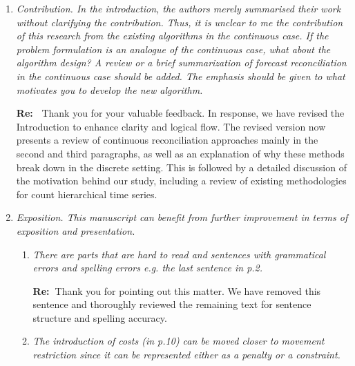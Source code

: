 \documentclass[11pt,a4paper]{article}
\newcommand{\RE}[2][Re:~]{{\color{blue}\textbf{#1}#2}}
\begin{document}
\begin{enumerate}
\begin{enumerate}
    \RE{Thank you for your suggestion. As mentioned in your previous comment, we have added Table~5 to illustrate the relationship between the hierarchy size and computational time. Here we show that for many of our examples, computational cost is not prohibitive taking 5 minutes for one of our empirical applications and 25 minutes for the other (the simulation studies are computed almost instantly). Furthermore, although reconciliation methods do not always outperform simpler benchmarks (which we reiterate are special cases of our new framework), in almost all our examples DFR or SDFR significantly outperforms the base forecasts.}


  \end{enumerate}

\item \textit{Contribution. In the introduction, the authors merely summarised their work without clarifying the contribution. Thus, it is unclear to me the contribution of this research from the existing algorithms in the continuous case. If the problem formulation is an analogue of the continuous case, what about the algorithm design? A review or a brief summarization of forecast reconciliation in the continuous case should be added. The emphasis should be given to what motivates you to develop the new algorithm.}

\RE{
  Thank you for your valuable feedback. In response, we have revised the Introduction to enhance clarity and logical flow. The revised version now presents a review of continuous reconciliation approaches mainly in the second and third paragraphs, as well as an explanation of why these methods break down in the discrete setting. This is followed by a detailed discussion of the motivation behind our study, including a review of existing methodologies for count hierarchical time series.
}


\item \textit{Exposition. This manuscript can benefit from further improvement in terms of exposition and presentation. }
\begin{enumerate}
    \item \textit{There are parts that are hard to read and sentences with grammatical errors and spelling errors e.g. the last sentence in p.2.}
    
    \RE{Thank you for pointing out this matter. We have removed this sentence and thoroughly reviewed the remaining text for sentence structure and spelling accuracy.}
    \item \textit{The introduction of costs (in p.10) can be moved closer to movement restriction since it can be represented either as a penalty or a constraint.}
    

\end{enumerate}
\end{enumerate}
\end{document}
